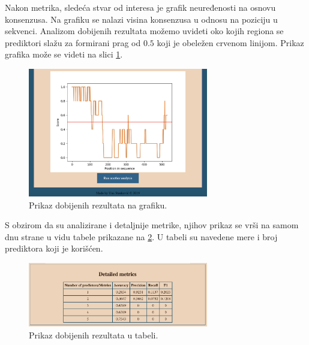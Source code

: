 Nakon metrika, sledeća stvar od interesa je grafik neuređenosti na osnovu konsenzusa. Na grafiku se nalazi visina konsenzusa u odnosu na poziciju u sekvenci.
Analizom dobijenih rezultata možemo uvideti oko kojih regiona se prediktori slažu za formirani prag od $0.5$ koji je obeležen crvenom linijom. Prikaz grafika može se videti na slici \ref{fig:grafik}.
\begin{figure}[H]
	\centering
    \includegraphics[width=0.7\textwidth]{Figures/App/sixth_screen.png}
    \caption{Prikaz dobijenih rezultata na grafiku.}
    \label{fig:grafik}
\end{figure}

S obzirom da su analizirane i detaljnije metrike, njihov prikaz se vrši na samom dnu strane u vidu tabele prikazane na \ref{fig:detailed}. U tabeli su navedene mere i broj prediktora koji je korišćen.
\begin{figure}[H]
	\centering
    \includegraphics[width=0.7\textwidth]{Figures/App/detailed.png}
    \caption{Prikaz dobijenih rezultata u tabeli.}
    \label{fig:detailed}
\end{figure}


